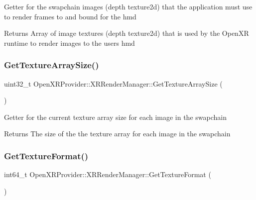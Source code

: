 Getter for the swapchain images (depth texture2d) that the application must use to render frames to and bound for the hmd \begin{DoxyReturn}{Returns}
Array of image textures (depth texture2d) that is used by the Open\+XR runtime to render images to the user\textquotesingle{}s hmd 
\end{DoxyReturn}
\mbox{\label{class_open_x_r_provider_1_1_x_r_render_manager_a87fa0e627b58a7892aa3e6a0efd9ab9b}} 
\subsubsection{\texorpdfstring{GetTextureArraySize()}{GetTextureArraySize()}}
{\footnotesize\ttfamily uint32\+\_\+t Open\+X\+R\+Provider\+::\+X\+R\+Render\+Manager\+::\+Get\+Texture\+Array\+Size (\begin{DoxyParamCaption}{ }\end{DoxyParamCaption})\hspace{0.3cm}{\ttfamily [inline]}}

Getter for the current texture array size for each image in the swapchain \begin{DoxyReturn}{Returns}
The size of the the texture array for each image in the swapchain 
\end{DoxyReturn}
\mbox{\label{class_open_x_r_provider_1_1_x_r_render_manager_aa5216277ffb9f00b43ba78fe0019da3f}} 
\subsubsection{\texorpdfstring{GetTextureFormat()}{GetTextureFormat()}}
{\footnotesize\ttfamily int64\+\_\+t Open\+X\+R\+Provider\+::\+X\+R\+Render\+Manager\+::\+Get\+Texture\+Format (\begin{DoxyParamCaption}{ }\end{DoxyParamCaption})\hspace{0.3cm}{\ttfamily [inline]}}

